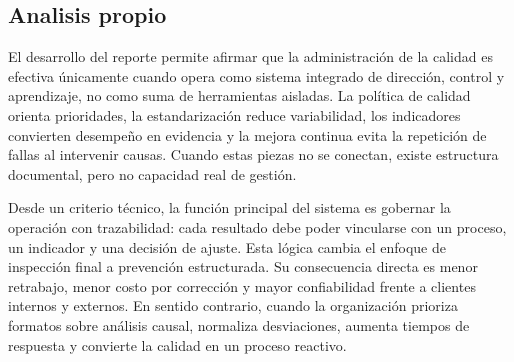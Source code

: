 \documentclass[
	spanish,
	letterpaper, oneside
]{article}
\begin{document}
%

\subsection{Analisis propio}

El desarrollo del reporte permite afirmar que la administración de la calidad es efectiva únicamente cuando opera como sistema integrado de dirección, control y aprendizaje, no como suma de herramientas aisladas. La política de calidad orienta prioridades, la estandarización reduce variabilidad, los indicadores convierten desempeño en evidencia y la mejora continua evita la repetición de fallas al intervenir causas. Cuando estas piezas no se conectan, existe estructura documental, pero no capacidad real de gestión.

Desde un criterio técnico, la función principal del sistema es gobernar la operación con trazabilidad: cada resultado debe poder vincularse con un proceso, un indicador y una decisión de ajuste. Esta lógica cambia el enfoque de inspección final a prevención estructurada. Su consecuencia directa es menor retrabajo, menor costo por corrección y mayor confiabilidad frente a clientes internos y externos. En sentido contrario, cuando la organización prioriza formatos sobre análisis causal, normaliza desviaciones, aumenta tiempos de respuesta y convierte la calidad en un proceso reactivo.
\end{document}
